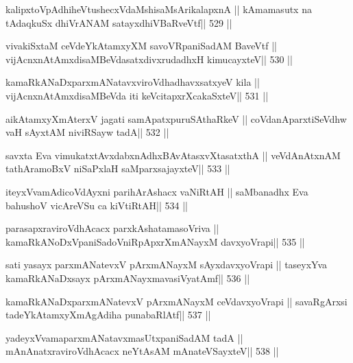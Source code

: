 \begin{shl}
kalipxtoVpAdhiheVtushecxVdaMshisaMsArikalapxnA ||
kAmamasutx na tAdaqkuSx dhiVrANAM satayxdhiVBaRveVtf\hfill || 529 ||
\end{shl}

\begin{shl}
vivakiSxtaM ceVdeYkAtamxyXM savoVRpaniSadAM BaveVtf ||
vijAcnxnAtAmxdisaMBeVdasatxdivxrudadhxH kimucayxteV\hfill || 530 ||
\end{shl}

\begin{shl}
kamaRkANaDxparxmANatavxviroVdhadhavxsatxyeV kila ||
vijAcnxnAtAmxdisaMBeVda iti keVcitapxrXcakaSxteV\hfill || 531 ||
\end{shl}

\begin{shl}
aikAtamxyXmAterxV jagati samApatxpuruSAthaRkeV ||
coVdanAparxtiSeVdhw vaH sAyxtAM niviRSayw tadA\hfill || 532 ||
\end{shl}

\begin{shl}
savxta Eva vimukatxtAvxdabxnAdhxBAvAtasxvXtasatxthA ||
veVdAnAtxnAM tathA\s\s ramoBxV niSaPxlaH saMparxsajayxteV\hfill || 533 ||
\end{shl}

\begin{shl}
iteyxVvamAdicoVdAyxni parihArAshacx vaNiRtAH ||
saMbanadhx Eva bahushoV vicAreVSu ca kiVtiRtAH\hfill || 534 ||
\end{shl}

\begin{shl}
parasapxraviroVdhAcacx parxkAshatamasoVriva ||
kamaRkANoDxVpaniSadoVniRpApxrXmANayxM davxyoVrapi\hfill || 535 ||
\end{shl}

\begin{shl}
sati yasayx parxmANatevxV pArxmANayxM sAyxdavxyoVrapi ||
taseyxYva kamaRkANaDxsayx pArxmANayxmavasiVyatAmf\hfill || 536 ||
\end{shl}

\begin{shl}
kamaRkANaDxparxmANatevxV pArxmANayxM ceVdavxyoVrapi ||
savaRgArxsi tadeYkAtamxyXmAgAdiha punabaRlAtf\hfill || 537 ||
\end{shl}

\begin{shl}
yadeyxVvamaparxmANatavxmasUtxpaniSadAM tadA ||
mAnAnatxraviroVdhAcacx neYtAsAM mAnateVSayxteV\hfill || 538 ||
\end{shl}

